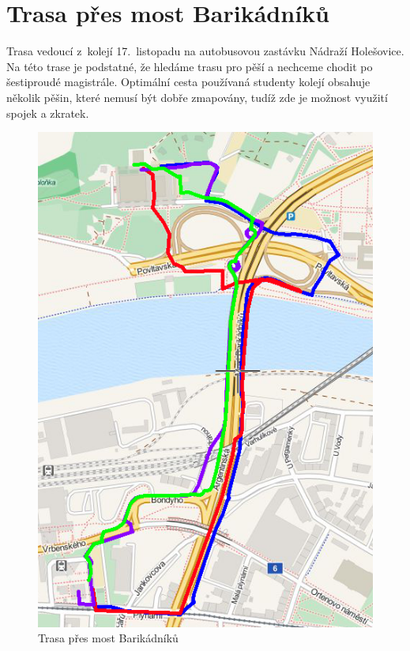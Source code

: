 \section{Trasa přes most Barikádníků}
Trasa vedoucí z~kolejí 17.~listopadu na autobusovou zastávku Nádraží Holešovice.
Na této trase je podstatné, že hledáme trasu pro pěší a nechceme chodit po
šestiproudé magistrále. Optimální cesta používaná studenty kolejí obsahuje
několik pěšin, které nemusí být dobře zmapovány, tudíž zde je možnost využití
spojek a zkratek.

\begin{figure}[h]
	\centering
	\includegraphics[width=13cm]{../img/kol-hol.png}
	\caption{Trasa přes most Barikádníků}
	\label{fig:kol-hol}
\end{figure}

